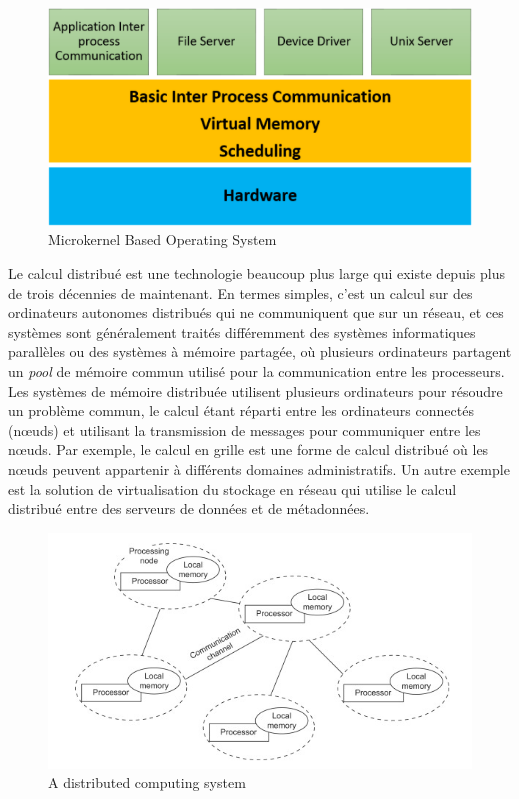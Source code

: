 \documentclass[a4paper, 12pt]{article}
\begin{document}
\begin{figure}[H]
	\centering
	\includegraphics[scale=0.7]{images/image2.PNG}
	\caption{Microkernel Based Operating System}
\end{figure}
\newline
Le calcul distribué est une technologie beaucoup plus large qui existe depuis plus de trois décennies de maintenant. En termes simples, c'est un calcul sur des ordinateurs autonomes distribués qui ne communiquent que sur un réseau, et ces systèmes sont généralement traités différemment des systèmes informatiques parallèles ou des systèmes à mémoire partagée, où plusieurs ordinateurs partagent un \emph{pool} de mémoire commun utilisé pour la communication entre les processeurs. Les systèmes de mémoire distribuée utilisent plusieurs ordinateurs pour résoudre un problème commun, le calcul étant réparti entre les ordinateurs connectés (nœuds) et utilisant la transmission de messages pour communiquer entre les nœuds. Par exemple, le calcul en grille est une forme de calcul distribué où les nœuds peuvent appartenir à différents domaines administratifs. Un autre exemple est la solution de virtualisation du stockage en réseau qui utilise le calcul distribué entre des serveurs de données et de métadonnées.
\begin{figure}[H]
	\centering
	\includegraphics[scale=0.8]{images/image3.PNG}
	\caption{A distributed computing system}
\end{figure}
\end{document}
